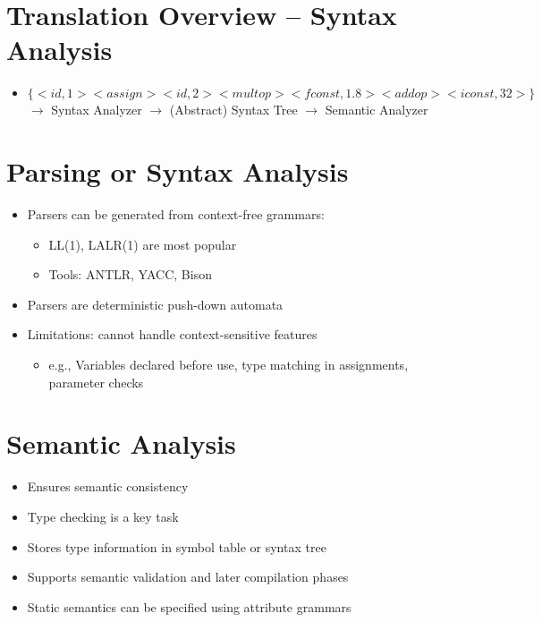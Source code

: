 \documentclass[a4paper,12pt]{article}
\begin{document}
\section{Translation Overview – Syntax Analysis}
\begin{itemize}[leftmargin=1.5em]
    \item $\{ <id,1> <assign> <id,2> <multop> <fconst,1.8> <addop> <iconst,32> \}$$\rightarrow$ Syntax Analyzer $\rightarrow$ (Abstract) Syntax Tree $\rightarrow$ Semantic Analyzer
\end{itemize}

\section{Parsing or Syntax Analysis}
\begin{itemize}[leftmargin=1.5em]
    \item Parsers can be generated from context-free grammars:
    \begin{itemize}
        \item LL(1), LALR(1) are most popular
        \item Tools: ANTLR, YACC, Bison
    \end{itemize}
    \item Parsers are deterministic push-down automata
    \item Limitations: cannot handle context-sensitive features
    \begin{itemize}
        \item e.g., Variables declared before use, type matching in assignments, parameter checks
    \end{itemize}
\end{itemize}

\section{Semantic Analysis}
\begin{itemize}[leftmargin=1.5em]
    \item Ensures semantic consistency
    \item Type checking is a key task
    \item Stores type information in symbol table or syntax tree
    \item Supports semantic validation and later compilation phases
    \item Static semantics can be specified using attribute grammars
\end{itemize}
\end{document}
